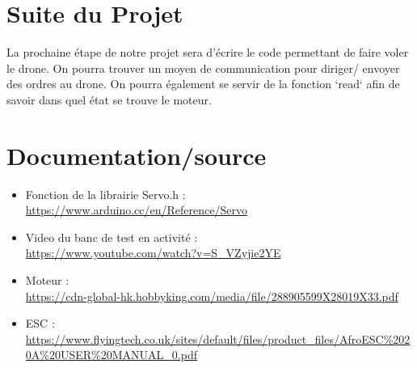 \documentclass[10pt,a4paper]{article}
\begin{document}
\section{Suite du Projet}
La prochaine étape de notre projet sera d'écrire le code permettant de faire voler le drone. On pourra trouver un moyen de communication pour diriger/ envoyer des ordres au drone. On pourra également se servir de la fonction `read` afin de savoir dans quel état se trouve le moteur.

\section{Documentation/source}
\begin{itemize}
 \item Fonction de la librairie Servo.h :\\
\url{https://www.arduino.cc/en/Reference/Servo}
\item Video du banc de test en activité : \\
\url{https://www.youtube.com/watch?v=S_VZyjie2YE}
\item Moteur : \\
\url{https://cdn-global-hk.hobbyking.com/media/file/288905599X28019X33.pdf}
\item ESC :\\
\url{https://www.flyingtech.co.uk/sites/default/files/product_files/AfroESC\%2020A\%20USER\%20MANUAL\_0.pdf}
\end{itemize}
\end{document}
